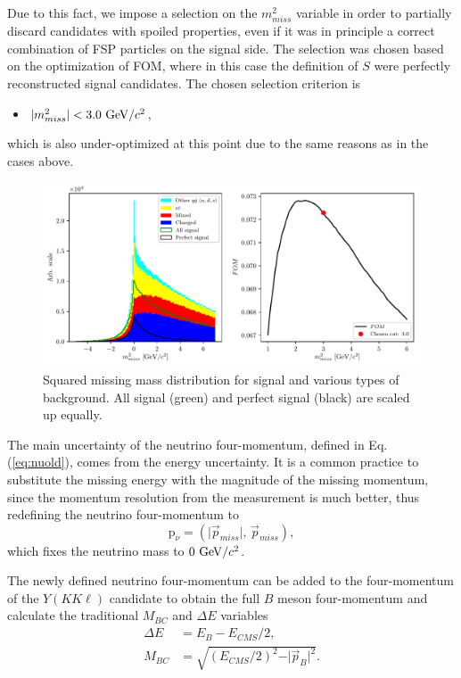 Due to this fact, we impose a selection on the $m_{miss}^2$ variable in order to partially discard candidates with spoiled properties, even if it was in principle a correct combination of FSP particles on the signal side. The selection was chosen based on the optimization of FOM, where in this case the definition of $S$ were perfectly reconstructed signal candidates. The chosen selection criterion is 
\begin{itemize}
	\item $\vert m_{miss}^2 \vert < 3.0\mathrm{~GeV}/c^2$,
\end{itemize}
which is also under-optimized at this point due to the same reasons as in the cases above.


\begin{figure}[H]
	\centering
	\captionsetup{width=.8\linewidth}
	\includegraphics[width=\linewidth]{fig/missM2}
	\caption{Squared missing mass distribution for signal and various types of background. All signal (green) and perfect signal (black) are scaled up equally.}
	\label{fig:missm2}
\end{figure}

The main uncertainty of the neutrino four-momentum, defined in Eq. (\ref{eq:nuold}), comes from the energy uncertainty. It is a common practice to substitute the missing energy with the magnitude of the missing momentum, since the momentum resolution from the measurement is much better, thus redefining the neutrino four-momentum to
\begin{equation}
\label{eq:nunew}
\mathrm{p}_\nu = \left(\vert \vec{p}_{miss} \vert,\,\vec{p}_{miss} \right),
\end{equation}
which fixes the neutrino mass to $0\mathrm{~GeV}/c^2$.

The newly defined neutrino four-momentum can be added to the four-momentum of the $Y(KK\ell)$ candidate to obtain the full $B$ meson four-momentum and calculate the traditional $M_{BC}$ and $\Delta E$ variables
\begin{align}
\label{eq:de}
\Delta E &= E_B - E_{CMS}/2,\\
M_{BC} &= \sqrt{\left(E_{CMS}/2\right)^2 - \vert \vec{p}_B \vert^2}.
\end{align}

